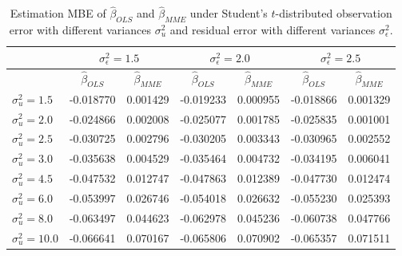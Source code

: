 \documentclass{article}
\begin{document}
\begin{table}[ht]
    \centering
    \caption{Estimation MBE of $\hat{\beta}_{OLS}$ and $\hat{\beta}_{MME}$ under Student's $t$-distributed observation error with different variances $\sigma^2_u$ and residual error with different variances $\sigma^2_\epsilon$.}
    \label{Tab:MBE_t}
    \begin{tabular}[t]{lcccccc}
        \hline
        &\multicolumn{2}{c}{$\sigma^2_\epsilon=1.5$}&\multicolumn{2}{c}{$\sigma^2_\epsilon=2.0$}&\multicolumn{2}{c}{$\sigma^2_\epsilon=2.5$}\\
        \hline
        &$\hat{\beta}_{OLS}$&$\hat{\beta}_{MME}$&$\hat{\beta}_{OLS}$&$\hat{\beta}_{MME}$&$\hat{\beta}_{OLS}$&$\hat{\beta}_{MME}$\\
        \hline
        $\sigma^2_u = 1.5$&-0.018770&0.001429&-0.019233&0.000955&-0.018866&0.001329\\
        $\sigma^2_u = 2.0$&-0.024866&0.002008&-0.025077&0.001785&-0.025835&0.001001\\
        $\sigma^2_u = 2.5$&-0.030725&0.002796&-0.030205&0.003343&-0.030965&0.002552\\
        $\sigma^2_u = 3.0$&-0.035638&0.004529&-0.035464&0.004732&-0.034195&0.006041\\
        $\sigma^2_u = 4.5$&-0.047532&0.012747&-0.047863&0.012389&-0.047730&0.012474\\
        $\sigma^2_u = 6.0$&-0.053997&0.026746&-0.054018&0.026632&-0.055230&0.025393\\
        $\sigma^2_u = 8.0$&-0.063497&0.044623&-0.062978&0.045236&-0.060738&0.047766\\
        $\sigma^2_u = 10.0$&-0.066641&0.070167&-0.065806&0.070902&-0.065357&0.071511\\
        \hline
    \end{tabular}
\end{table}
\end{document}
